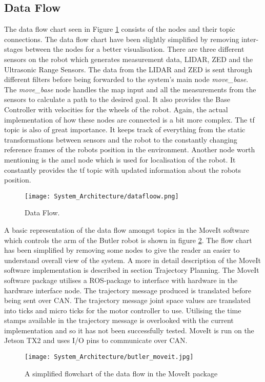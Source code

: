 \subsection{Data Flow}
The data flow chart seen in Figure \ref{fig:data_flow} consists of the nodes and their topic connections. The data flow chart have been slightly simplified by removing inter-stages between the nodes for a better visualisation.
There are three different sensors on the robot which generates measurement data, LIDAR, ZED and the Ultrasonic Range Sensors. The data from the LIDAR and ZED is sent through different filters before being forwarded to the system's main node \textit{move\_base}. The \textit{move\_base} node handles the map input and all the measurements from the sensors to calculate a path to the desired goal. It also provides the Base Controller with velocities for the wheels of the robot. Again, the actual implementation of how these nodes are connected is a bit more complex. The tf topic is also of great importance. It keeps track of everything from the static transformations between sensors and the robot to the constantly changing reference frames of the robots position in the environment. Another node worth mentioning is the amcl node which is used for localisation of the robot. It constantly provides the tf topic with updated information about the robots position.\\
\begin{figure}
  \texttt{[image: System\_Architecture/datafloow.png]}
  \caption{Data Flow.}
  \label{fig:data_flow}
\end{figure}
\indent A basic representation of the data flow amongst topics in the MoveIt software which controls the arm of the Butler robot is shown in figure \ref{moveit_flowchart}. The flow chart has been simplified by removing some nodes to give the reader an easier to understand overall view of the system. A more in detail description of the MoveIt software implementation is described in section Trajectory Planning. The MoveIt software package utilises a ROS-package to interface with hardware in the hardware interface node. The trajectory message produced is translated before being sent over CAN. The trajectory message joint space values are translated into ticks and micro ticks for the motor controller to use. Utilising the time stamps available in the trajectory message is overlooked with the current implementation and so it has not been successfully tested. MoveIt is run on the Jetson TX2 and uses I/O pins to communicate over CAN.
\begin{figure}[!ht]
\centering
\texttt{[image: System\_Architecture/butler\_moveit.jpg]}
\caption{A simplified flowchart of the data flow in the MoveIt package}
\label{moveit_flowchart}
\end{figure}

